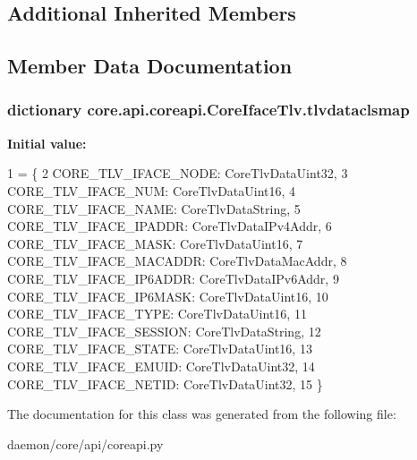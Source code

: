 \subsection*{Additional Inherited Members}


\subsection{Member Data Documentation}
\hypertarget{classcore_1_1api_1_1coreapi_1_1_core_iface_tlv_a8da9c0f8ff6e2e92b8c4a824f9c21aec}{
\subsubsection[{tlvdataclsmap}]{\setlength{\rightskip}{0pt plus 5cm}dictionary core.\+api.\+coreapi.\+Core\+Iface\+Tlv.\+tlvdataclsmap\hspace{0.3cm}{\ttfamily [static]}}}\label{classcore_1_1api_1_1coreapi_1_1_core_iface_tlv_a8da9c0f8ff6e2e92b8c4a824f9c21aec}
{\bfseries Initial value\+:}
\begin{DoxyCode}
1 = \{
2         CORE\_TLV\_IFACE\_NODE: CoreTlvDataUint32,
3         CORE\_TLV\_IFACE\_NUM: CoreTlvDataUint16,
4         CORE\_TLV\_IFACE\_NAME: CoreTlvDataString,
5         CORE\_TLV\_IFACE\_IPADDR: CoreTlvDataIPv4Addr,
6         CORE\_TLV\_IFACE\_MASK: CoreTlvDataUint16,
7         CORE\_TLV\_IFACE\_MACADDR: CoreTlvDataMacAddr,
8         CORE\_TLV\_IFACE\_IP6ADDR: CoreTlvDataIPv6Addr,
9         CORE\_TLV\_IFACE\_IP6MASK: CoreTlvDataUint16,
10         CORE\_TLV\_IFACE\_TYPE: CoreTlvDataUint16,
11         CORE\_TLV\_IFACE\_SESSION: CoreTlvDataString,
12         CORE\_TLV\_IFACE\_STATE: CoreTlvDataUint16,
13         CORE\_TLV\_IFACE\_EMUID: CoreTlvDataUint32,
14         CORE\_TLV\_IFACE\_NETID: CoreTlvDataUint32,
15     \}
\end{DoxyCode}


The documentation for this class was generated from the following file\+:\begin{DoxyCompactItemize}
\item 
daemon/core/api/coreapi.\+py\end{DoxyCompactItemize}

